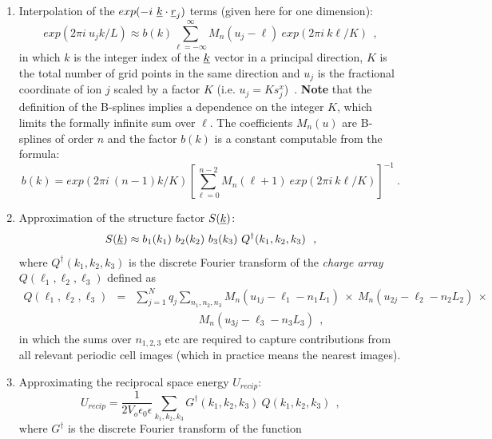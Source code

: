 \begin{enumerate}
\item Interpolation of the $exp(-i~\mbox{$\underline{k}$}\cdot\mbox{$\underline{r}$}_{j})$ terms
(given here for one dimension):
\begin{equation}
exp(2\pi i~u_{j} k/L) \approx b(k) \sum_{\ell=-\infty}^{\infty}
M_{n}(u_{j}-\ell)~exp(2\pi i~k\ell/K)~~,
\end{equation}
in which $k$ is the integer index of the $\mbox{$\underline{k}$}$ vector in a
principal direction, $K$ is the total number of grid points in the
same direction and $u_{j}$ is the fractional coordinate of ion $j$
scaled by a factor $K$ (i.e. $u_{j}=K s_{j}^{x}$)~.  {\bf Note} that
the definition of the B-splines implies a dependence on the integer
$K$, which limits the formally infinite sum over $\ell$.  The
coefficients $M_{n}(u)$ are B-splines of order $n$ and the factor
$b(k)$ is a constant computable from the formula:
\begin{equation}
b(k) = exp(2\pi i~(n-1)k/K) \left[ \sum_{\ell=0}^{n-2}
M_{n}(\ell+1)~exp(2\pi i~k\ell/K) \right]^{-1}~.
\end{equation}
\item Approximation of the structure factor $S(\mbox{$\underline{k}$})$:
\begin{equation}
S(\mbox{$\underline{k}$}) \approx b_{1}(k_{1})~b_{2}(k_{2})~b_{3}(k_{3})~Q^{\dagger}(k_{1},k_{2},k_{3})~~,
\end{equation}
where $Q^{\dagger}(k_{1},k_{2},k_{3})$ is the discrete Fourier transform of
the {\em charge array} $Q(\ell_{1},\ell_{2},\ell_{3})$ defined as
\begin{eqnarray}
Q(\ell_{1},\ell_{2},\ell_{3})&=& \sum_{j=1}^{N}q_{j}
\sum_{n_{1},n_{2},n_{3}} M_{n}(u_{1j}-\ell_{1}-n_{1}L_{1})~\times~
M_{n}(u_{2j}-\ell_{2}-n_{2}L_{2})~\times~ \phantom{xxxx} \nonumber \\
& & \phantom{xxxxxxxxxx} M_{n}(u_{3j}-\ell_{3}-n_{3}L_{3})~~,
\end{eqnarray}
in which the sums over $n_{1,2,3}$ etc are required to capture
contributions from all relevant periodic cell images (which in
practice means the nearest images).
\item Approximating the reciprocal space energy $U_{recip}$:
\begin{equation}
U_{recip} = \frac{1}{2V_{o} \epsilon_{0}\epsilon} \sum_{k_{1},k_{2},k_{3}}
G^{\dagger}(k_{1},k_{2},k_{3})~Q(k_{1},k_{2},k_{3})~~,
\end{equation}
where $G^{\dagger}$ is the discrete Fourier transform of the
function
\begin{equation}

\end{equation}
\end{enumerate}
